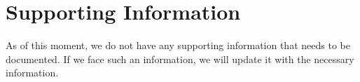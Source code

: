 \chapter{Supporting Information}
\label{ch:supporting information}

As of this moment, we do not have any supporting information that needs
to be documented. If we face such an information, we will update it with
the necessary information.